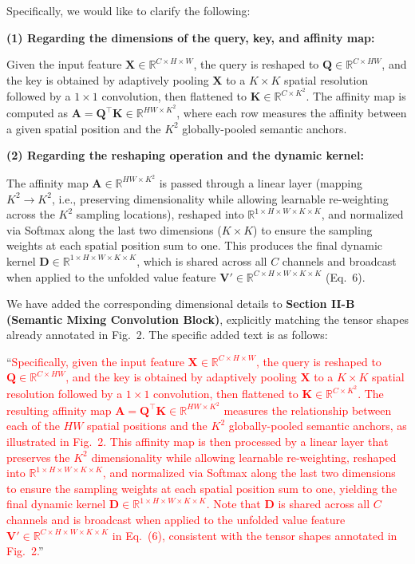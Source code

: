 Specifically, we would like to clarify the following:

\textbf{(1) Regarding the dimensions of the query, key, and affinity map:}

Given the input feature $\mathbf{X} \in \mathbb{R}^{C \times H \times W}$, the query is reshaped to $\mathbf{Q} \in \mathbb{R}^{C \times HW}$, and the key is obtained by adaptively pooling $\mathbf{X}$ to a $K \times K$ spatial resolution followed by a $1\times1$ convolution, then flattened to $\mathbf{K} \in \mathbb{R}^{C \times K^2}$. The affinity map is computed as $\mathbf{A} = \mathbf{Q}^{\top}\mathbf{K} \in \mathbb{R}^{HW \times K^2}$, where each row measures the affinity between a given spatial position and the $K^2$ globally-pooled semantic anchors.

\textbf{(2) Regarding the reshaping operation and the dynamic kernel:}

The affinity map $\mathbf{A} \in \mathbb{R}^{HW \times K^2}$ is passed through a linear layer (mapping $K^2 \to K^2$, i.e., preserving dimensionality while allowing learnable re-weighting across the $K^2$ sampling locations), reshaped into $\mathbb{R}^{1 \times H \times W \times K \times K}$, and normalized via Softmax along the last two dimensions ($K \times K$) to ensure the sampling weights at each spatial position sum to one. This produces the final dynamic kernel $\mathbf{D} \in \mathbb{R}^{1 \times H \times W \times K \times K}$, which is shared across all $C$ channels and broadcast when applied to the unfolded value feature $\mathbf{V}' \in \mathbb{R}^{C \times H \times W \times K \times K}$ (Eq.~6).

We have added the corresponding dimensional details to \textbf{Section II-B (Semantic Mixing Convolution Block)}, explicitly matching the tensor shapes already annotated in Fig.~2. The specific added text is as follows:

``\textcolor{red}{Specifically, given the input feature $\mathbf{X} \in \mathbb{R}^{C \times H \times W}$, the query is reshaped to $\mathbf{Q} \in \mathbb{R}^{C \times HW}$, and the key is obtained by adaptively pooling $\mathbf{X}$ to a $K \times K$ spatial resolution followed by a $1\times1$ convolution, then flattened to $\mathbf{K} \in \mathbb{R}^{C \times K^2}$. The resulting affinity map $\mathbf{A} = \mathbf{Q}^{\top}\mathbf{K} \in \mathbb{R}^{HW \times K^2}$ measures the relationship between each of the $HW$ spatial positions and the $K^2$ globally-pooled semantic anchors, as illustrated in Fig.~2. This affinity map is then processed by a linear layer that preserves the $K^2$ dimensionality while allowing learnable re-weighting, reshaped into $\mathbb{R}^{1 \times H \times W \times K \times K}$, and normalized via Softmax along the last two dimensions to ensure the sampling weights at each spatial position sum to one, yielding the final dynamic kernel $\mathbf{D} \in \mathbb{R}^{1 \times H \times W \times K \times K}$. Note that $\mathbf{D}$ is shared across all $C$ channels and is broadcast when applied to the unfolded value feature $\mathbf{V}' \in \mathbb{R}^{C \times H \times W \times K \times K}$ in Eq.~(6), consistent with the tensor shapes annotated in Fig.~2.}''

